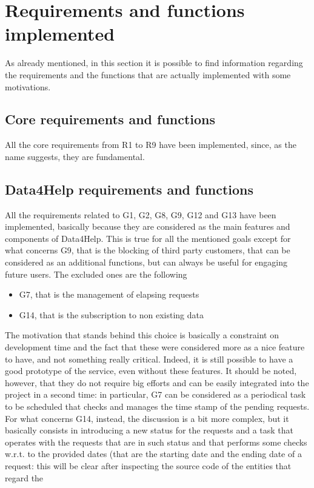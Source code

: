\section{Requirements and functions implemented}
As already mentioned, in this section it is possible to find information regarding the requirements and the functions that are actually implemented with some motivations.

\subsection{Core requirements and functions}
All the core requirements from R1 to R9 have been implemented, since, as the name suggests, they are fundamental. 

\subsection{Data4Help requirements and functions}
All the requirements related to G1, G2, G8, G9, G12 and G13 have been implemented, basically because they 
are considered as the main features and components of Data4Help. 
This is true for all the mentioned goals except for what concerns G9, that is the blocking of third party
customers, that can be considered as an additional functions, but can always be useful for engaging future users.
The excluded ones are the following
\begin{itemize}
\item G7, that is the management of elapsing requests 
\item G14, that is the subscription to non existing data
\end{itemize}
The motivation that stands behind this choice is basically a constraint on development time and the
fact that these were considered more as a nice feature to have, and not something really critical. 
Indeed, it is still possible to have a good prototype of the service, even without these features.
It should be noted, however, that they do not require big efforts and can be easily integrated into the
project in a second time: in particular, G7 can be considered as a periodical task to be scheduled that
checks and manages the time stamp of the pending requests. 
For what concerns G14, instead, the discussion is a bit more complex, but it basically consists in introducing a new status for the
requests and a task that operates with the requests that are in such status and that performs some checks w.r.t. to the provided dates 
(that are the starting date and the ending date of a request: this will be clear after inspecting the source code of the entities that regard the
